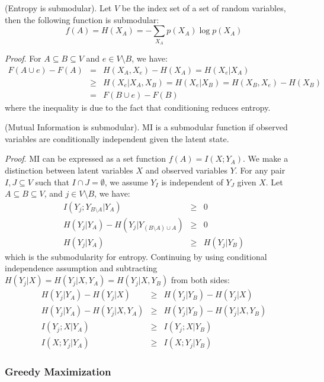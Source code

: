 \begin{theorem}
(Entropy is submodular). Let $V$ be the index set of a set of random variables, then the following function is submodular:
\begin{equation}
    f(A) = H(X_A) = - \sum_{X_A} p(X_A)\log p(X_A)
\end{equation}
\end{theorem}
\textit{Proof}. For $A \subseteq B \subseteq V$ and $e \in V \setminus B$, we have:
\begin{eqnarray}
    F(A\cup {e}) - F(A) &=& H(X_A,X_e) - H(X_A) = H(X_e|X_A) \\
                        &\geq& H(X_e|X_A, X_B) = H(X_e|X_B) =  H(X_B,X_e) - H(X_B) \\
                        &=& F(B\cup {e}) - F(B)
\end{eqnarray}
where the inequality is due to the fact that conditioning reduces entropy. 

\begin{theorem}
(Mutual Information is submodular). MI is a submodular function if observed variables are conditionally independent given the latent state. 
\end{theorem}
\textit{Proof}. MI can be expressed as a set function $f(A) = I(X;Y_A)$. We make a distinction between latent variables $X$ and observed variables $Y$. For any pair $I, J \subseteq V$ such that $I \cap J = \emptyset$, we assume $Y_I$ is independent of $Y_J$ given $X$. Let $A\subseteq B\subseteq V$, and $j \in V\setminus B$, we have:
\begin{eqnarray}
    I(Y_j; Y_{B\setminus A} | Y_A) &\geq& 0 \\
    H(Y_j|Y_A) - H(Y_j|Y_{(B\setminus A)\cup A}) &\geq& 0 \\
    H(Y_j|Y_A) &\geq& H(Y_j|Y_B)
\end{eqnarray}
which is the submodularity for entropy. Continuing by using conditional independence assumption and subtracting $H(Y_j|X)=H(Y_j|X,Y_A)=H(Y_j|X,Y_B)$ from both sides:
\begin{eqnarray}
    H(Y_j|Y_A) - H(Y_j|X) &\geq& H(Y_j|Y_B) - H(Y_j|X)\\
    H(Y_j|Y_A) - H(Y_j|X,Y_A) &\geq& H(Y_j|Y_B) - H(Y_j|X, Y_B)\\
    I(Y_j;X|Y_A) &\geq& I(Y_j;X|Y_B) \\
    I(X;Y_j|Y_A) &\geq& I(X;Y_j|Y_B) 
\end{eqnarray}

\subsubsection{Greedy Maximization}

